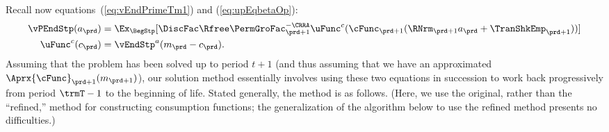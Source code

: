 \documentclass[\econtexRoot/SolvingMicroDSOPs]{subfiles}
\begin{document}
Recall now equations~(\ref{eq:vEndPrimeTm1}) and (\ref{eq:upEqbetaOp}):
\begin{equation*}\begin{gathered}\begin{aligned}
      \vPEndStp(a_{\prd})  & = \Ex_{\BegStp}[\DiscFac \Rfree \PermGroFac_{\prd+1}^{-\CRRA}
      \uFunc^{c}(\cFunc_{\prd+1}(\RNrm_{\prd+1} a_{\prd}+{\TranShkEmp}_{\prd+1}))]
      \\\uFunc^{c}(c_{\prd})   & = \vEndStp^{a}(m_{\prd}-c_{\prd}).
    \end{aligned}\end{gathered}\end{equation*}
Assuming that the problem has been solved up to period $t+1$ (and thus assuming that we have an approximated $\Aprx{\cFunc}_{\prd+1}(m_{\prd+1})$), our solution method essentially involves using these two equations in succession to work back progressively from period $\trmT-1$ to the beginning of life.  Stated generally, the method is as follows.  (Here, we use the original, rather than the ``refined,'' method for constructing consumption functions; the generalization of the algorithm below to use the refined method presents no difficulties.)
\end{document}
